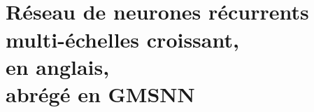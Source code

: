 \part[\Glsentrytext{project_gmsnn}]{\\[1em]{\Large Réseau de neurones récurrents multi-échelles croissant,\\  en anglais,\\ abrégé en GMSNN}}\cleardoublepage
\cleardoublepage
\cleardoublepage
\cleardoublepage
\cleardoublepage
\cleardoublepage
\cleardoublepage